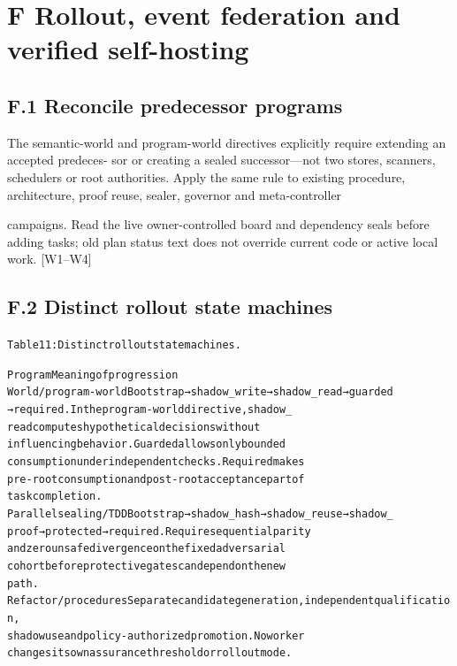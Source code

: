 \section*{F Rollout, event federation and verified self-hosting}
\subsection*{F.1 Reconcile predecessor programs}

The semantic-world and program-world directives explicitly require extending an accepted predeces-
sor or creating a sealed successor—not two stores, scanners, schedulers or root authorities. Apply
the same rule to existing procedure, architecture, proof reuse, sealer, governor and meta-controller


campaigns. Read the live owner-controlled board and dependency seals before adding tasks; old plan
status text does not override current code or active local work. [W1–W4]

\subsection*{F.2 Distinct rollout state machines}

\begingroup\fontsize{7}{8.4}\selectfont
\begin{alltt}
Table 11: Distinct rollout state machines.
\end{alltt}\endgroup

\begingroup\fontsize{7}{8.4}\selectfont
\begin{alltt}
Program                                      Meaning of progression
World / program-world                        Bootstrap → shadow\_write → shadow\_read → guarded
                                             → required. In the program-world directive, shadow\_
                                             read computes hypothetical decisions without
                                             influencing behavior. Guarded allows only bounded
                                             consumption under independent checks. Required makes
                                             pre-root consumption and post-root acceptance part of
                                             task completion.
Parallel sealing / TDD                       Bootstrap → shadow\_hash → shadow\_reuse → shadow\_
                                             proof → protected → required. Require sequential parity
                                             and zero unsafe divergence on the fixed adversarial
                                             cohort before protective gates can depend on the new
                                             path.
Refactor / procedures                        Separate candidate generation, independent qualification,
                                             shadow use and policy-authorized promotion. No worker
                                             changes its own assurance threshold or rollout mode.
\end{alltt}\endgroup


